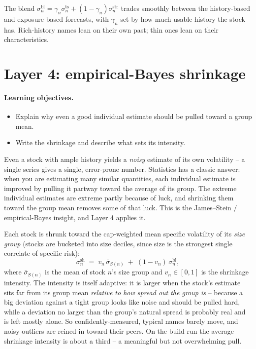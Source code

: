 \documentclass[11pt]{article}
\theoremstyle{definition}
\theoremstyle{plain}
\theoremstyle{remark}
\begin{document}
\begin{keyresult}
The blend $\sigma^{\text{bl}}_n=\gamma_n\sigma^{\text{ts}}_n+(1-\gamma_n)\sigma^{\text{str}}_n$ trades smoothly between the history-based and exposure-based forecasts, with $\gamma_n$ set by how much usable history the stock has. Rich-history names lean on their own past; thin ones lean on their characteristics.
\end{keyresult}

\section{Layer 4: empirical-Bayes shrinkage}\label{sec:shrink}

\paragraph{Learning objectives.}
\begin{itemize}[leftmargin=1.4em,topsep=2pt]
  \item Explain why even a good individual estimate should be pulled toward a group mean.
  \item Write the shrinkage and describe what sets its intensity.
\end{itemize}

Even a stock with ample history yields a \emph{noisy} estimate of its own volatility -- a single series gives a single, error-prone number. Statistics has a classic answer: when you are estimating many similar quantities, each individual estimate is improved by pulling it partway toward the average of its group. The extreme individual estimates are extreme partly because of luck, and shrinking them toward the group mean removes some of that luck. This is the James--Stein / empirical-Bayes insight, and Layer 4 applies it.

Each stock is shrunk toward the cap-weighted mean specific volatility of its \emph{size group} (stocks are bucketed into size deciles, since size is the strongest single correlate of specific risk):
\[
\sigma^{\text{sh}}_n \;=\; v_n\,\bar\sigma_{S(n)} \;+\; (1-v_n)\,\sigma^{\text{bl}}_n ,
\]
where $\bar\sigma_{S(n)}$ is the mean of stock $n$'s size group and $v_n\in[0,1]$ is the shrinkage intensity. The intensity is itself adaptive: it is larger when the stock's estimate sits far from its group mean \emph{relative to how spread out the group is} -- because a big deviation against a tight group looks like noise and should be pulled hard, while a deviation no larger than the group's natural spread is probably real and is left mostly alone. So confidently-measured, typical names barely move, and noisy outliers are reined in toward their peers. On the build run the average shrinkage intensity is about a third -- a meaningful but not overwhelming pull.
\end{document}
